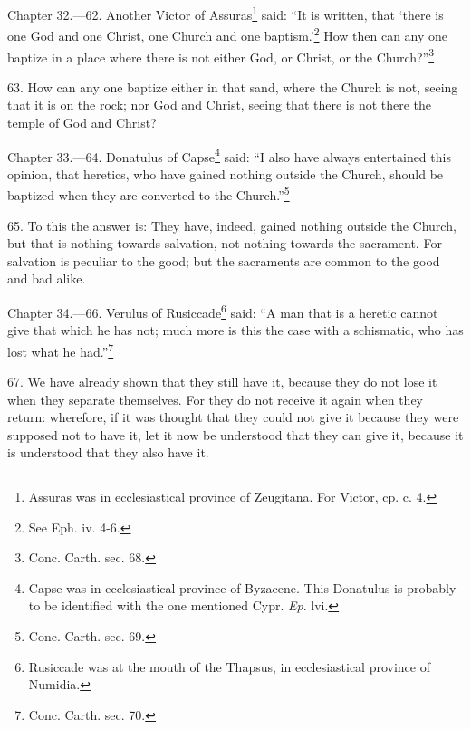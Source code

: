 
Chapter 32.—62. Another Victor of Assuras\footnote{\par  Assuras was in ecclesiastical province of Zeugitana. For Victor, cp. c. 4.} said: ``It is written, that ‘there is one God and one Christ, one Church and one baptism.’\footnote{\par  See Eph. iv. 4-6.} How then can any one baptize in a place where there is not either God, or Christ, or the Church?''\footnote{\par  Conc. Carth. sec. 68.}

63. How can any one baptize either in that sand, where the Church is not, seeing that it is on the rock; nor God and Christ, seeing that there is not there the temple of God and Christ?


Chapter 33.—64. Donatulus of Capse\footnote{\par  Capse was in ecclesiastical province of Byzacene. This Donatulus is probably to be identified with the one mentioned Cypr. \emph{Ep}. lvi.} said: ``I also have always entertained this opinion, that heretics, who have gained nothing outside the Church, should be baptized when they are converted to the Church.''\footnote{\par  Conc. Carth. sec. 69.}

65. To this the answer is: They have, indeed, gained nothing outside the Church, but that is nothing towards salvation, not nothing towards the sacrament. For salvation is peculiar to the good; but the sacraments are common to the good and bad alike.


Chapter 34.—66. Verulus of Rusiccade\footnote{\par  Rusiccade was at the mouth of the Thapsus, in ecclesiastical province of Numidia.} said: ``A man that is a heretic cannot give that which he has not; much more is this the case with a schismatic, who has lost what he had.''\footnote{\par  Conc. Carth. sec. 70.}

67. We have already shown that they still have it, because they do not lose it when they separate themselves. For they do not receive it again when they return: wherefore, if it was thought that they could not give it because they were supposed not to have it, let it now be understood that they can give it, because it is understood that they also have it.

